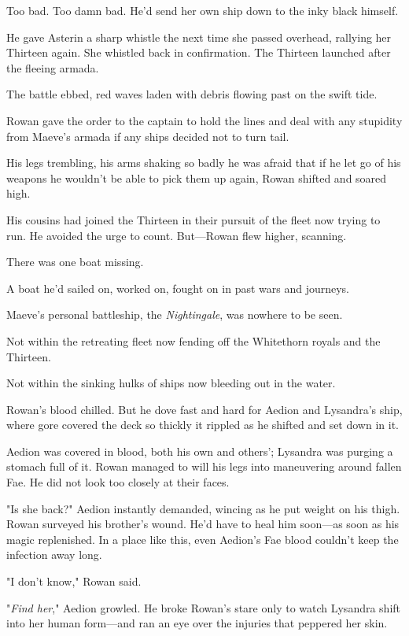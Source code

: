 Too bad.
Too damn bad.
He'd send her own ship down to the inky black himself.

He gave Asterin a sharp whistle the next time she passed overhead, rallying her Thirteen again.
She whistled back in confirmation.
The Thirteen launched after the fleeing armada.

The battle ebbed, red waves laden with debris flowing past on the swift tide.

Rowan gave the order to the captain to hold the lines and deal with any stupidity from Maeve's armada if any ships decided not to turn tail.

His legs trembling, his arms shaking so badly he was afraid that if he let go of his weapons he wouldn't be able to pick them up again, Rowan shifted and soared high.

His cousins had joined the Thirteen in their pursuit of the fleet now trying to run.
He avoided the urge to count.
But---Rowan flew higher, scanning.

There was one boat missing.

A boat he'd sailed on, worked on, fought on in past wars and journeys.

Maeve's personal battleship, the \emph{Nightingale}, was nowhere to be seen.

Not within the retreating fleet now fending off the Whitethorn royals and the Thirteen.

Not within the sinking hulks of ships now bleeding out in the water.

Rowan's blood chilled.
But he dove fast and hard for Aedion and Lysandra's ship, where gore covered the deck so thickly it rippled as he shifted and set down in it.

Aedion was covered in blood, both his own and others'; Lysandra was purging a stomach full of it.
Rowan managed to will his legs into maneuvering around fallen Fae.
He did not look too closely at their faces.

"Is she back?"
Aedion instantly demanded, wincing as he put weight on his thigh.
Rowan surveyed his brother's wound.
He'd have to heal him soon---as soon as his magic replenished.
In a place like this, even Aedion's Fae blood couldn't keep the infection away long.

"I don't know," Rowan said.

"\emph{Find her}," Aedion growled.
He broke Rowan's stare only to watch Lysandra shift into her human form---and ran an eye over the injuries that peppered her skin.

